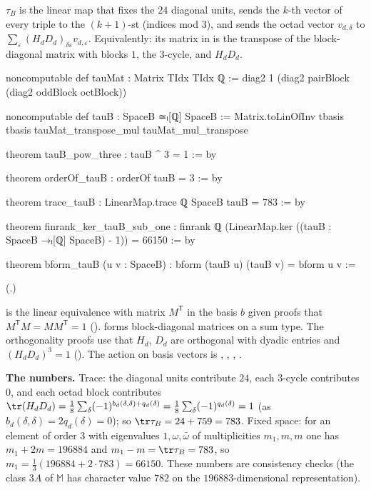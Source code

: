 \begin{definition}[$\tau_B$]\label{ch21:def:tauB}
$\tau_B$ is the linear map that fixes the $24$ diagonal units, sends the $k$-th vector of every triple to the
$(k+1)$-st (indices mod $3$), and sends the octad vector $v_{d,\delta}$ to
$\sum_\varepsilon(H_dD_d)_{\delta\varepsilon}v_{d,\varepsilon}$.  Equivalently: its matrix in  is the
transpose of the block-diagonal matrix  with blocks $1$, the $3$-cycle, and $H_dD_d$.
\end{definition}
\begin{leancode}
noncomputable def tauMat : Matrix TIdx TIdx ℚ :=
  diag2 1 (diag2 pairBlock (diag2 oddBlock octBlock))
\end{leancode}
\begin{leancode}
noncomputable def tauB : SpaceB ≃ₗ[ℚ] SpaceB :=
  Matrix.toLinOfInv tbasis tbasis tauMat_transpose_mul tauMat_mul_transpose
\end{leancode}
\begin{leancode}
theorem tauB_pow_three : tauB ^ 3 = 1 := by
\end{leancode}
\begin{leancode}
theorem orderOf_tauB : orderOf tauB = 3 := by
\end{leancode}
\begin{leancode}
theorem trace_tauB : LinearMap.trace ℚ SpaceB tauB = 783 := by
\end{leancode}
\begin{leancode}
theorem finrank_ker_tauB_sub_one :
    finrank ℚ (LinearMap.ker ((tauB : SpaceB →ₗ[ℚ] SpaceB) - 1)) = 66150 := by
\end{leancode}
\begin{leancode}
theorem bform_tauB (u v : SpaceB) : bform (tauB u) (tauB v) = bform u v :=
\end{leancode}
(.)
\begin{dictionary}
 is the linear equivalence with matrix $M^{\mathsf T}$ in the basis
$b$ given proofs that $M^{\mathsf T}M=MM^{\mathsf T}=1$ ().
 forms block-diagonal matrices on a sum type.  The orthogonality proofs use that $H_d$,
$D_d$ are orthogonal with dyadic entries and $(H_dD_d)^3=1$ ().
The action on basis vectors is , , , .

\textbf{The numbers.}  Trace: the diagonal units contribute $24$, each $3$-cycle contributes $0$, and
each octad block contributes $\tr(H_dD_d)=\tfrac18\sum_\delta(-1)^{b_d(\delta,\delta)+q_d(\delta)}=\tfrac18\sum_\delta(-1)^{q_d(\delta)}=1$
(as $b_d(\delta,\delta)=2q_d(\delta)=0$); so $\tr\tau_B=24+759=783$.  Fixed space: for an element of order $3$
with eigenvalues $1,\omega,\bar\omega$ of multiplicities $m_1,m,m$ one has $m_1+2m=196884$ and
$m_1-m=\tr\tau_B=783$, so $m_1=\tfrac13(196884+2\cdot783)=66150$.  These numbers are consistency checks
(the class $3A$ of $\mathbb M$ has character value $782$ on the $196883$-dimensional representation).
\end{dictionary}
